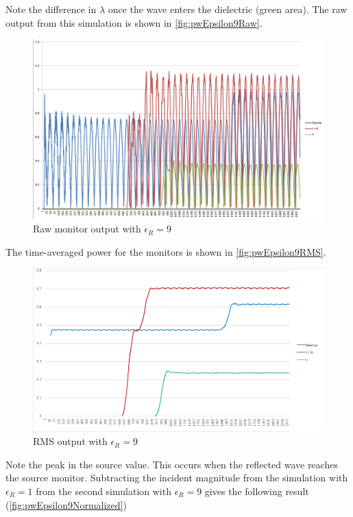 Note the difference in $\lambda$ once the wave enters the dielectric (green area).  The raw output from this simulation is shown in \autoref{fig:pwEpsilon9Raw}.

\begin{figure}[H]
	\centering
	\includegraphics[width=\textwidth,
	keepaspectratio]{pw-epsilon-9-raw.png}
	\caption{Raw monitor output with $\epsilon_R = 9$}
	\label{fig:pwEpsilon9Raw}
\end{figure}

The time-averaged power for the monitors is shown in \autoref{fig:pwEpsilon9RMS}.

\begin{figure}[H]
	\centering
	\includegraphics[width=\textwidth,
	keepaspectratio]{pw-epsilon-9-rms.png}
	\caption{RMS output with $\epsilon_R = 9$}
	\label{fig:pwEpsilon9RMS}
\end{figure}
Note the peak in the source value. This occurs when the reflected wave reaches the source monitor. 
Subtracting the incident magnitude from the simulation with $\epsilon_R = 1$ from the second simulation with $\epsilon_R = 9$ gives the following result (\autoref{fig:pwEpsilon9Normalized})

